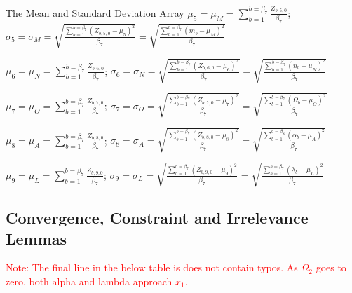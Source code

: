 \begin{definition}{The Mean and Standard Deviation Array}
$\mu_{5}=\mu_{M}=\sum_{b=1}^{b=\beta_{7}}\frac{Z_{b,5,0}}{\beta_{7}}$; $\sigma_{5}=\sigma_{M}=\sqrt{\frac{\sum_{b=1}^{b=\beta_{7}}(Z_{b,5,0}-\mu_{5})^2}{\beta_{7}}}=\sqrt{\frac{\sum_{b=1}^{b=\beta_{7}}(m_{b}-\mu_{M})^2}{\beta_{7}}}$

$\mu_{6}=\mu_{N}=\sum_{b=1}^{b=\beta_{7}}\frac{Z_{b,6,0}}{\beta_{7}}$; $\sigma_{6}=\sigma_{N}=\sqrt{\frac{\sum_{b=1}^{b=\beta_{7}}(Z_{b,6,0}-\mu_{6})^2}{\beta_{7}}}=\sqrt{\frac{\sum_{b=1}^{b=\beta_{7}}(n_{b}-\mu_{N})^2}{\beta_{7}}}$

$\mu_{7}=\mu_{O}=\sum_{b=1}^{b=\beta_{7}}\frac{Z_{b,7,0}}{\beta_{7}}$; $\sigma_{7}=\sigma_{O}=\sqrt{\frac{\sum_{b=1}^{b=\beta_{7}}(Z_{b,7,0}-\mu_{7})^2}{\beta_{7}}}=\sqrt{\frac{\sum_{b=1}^{b=\beta_{7}}(\Omega_{b}-\mu_{O})^2}{\beta_{7}}}$

$\mu_{8}=\mu_{A}=\sum_{b=1}^{b=\beta_{7}}\frac{Z_{b,8,0}}{\beta_{7}}$; $\sigma_{8}=\sigma_{A}=\sqrt{\frac{\sum_{b=1}^{b=\beta_{7}}(Z_{b,8,0}-\mu_{8})^2}{\beta_{7}}}=\sqrt{\frac{\sum_{b=1}^{b=\beta_{8}}(\alpha_{b}-\mu_{A})^2}{\beta_{7}}}$

$\mu_{9}=\mu_{L}=\sum_{b=1}^{b=\beta_{7}}\frac{Z_{b,9,0}}{\beta_{7}}$; $\sigma_{9}=\sigma_{L}=\sqrt{\frac{\sum_{b=1}^{b=\beta_{7}}(Z_{b,9,0}-\mu_{9})^2}{\beta_{7}}}=\sqrt{\frac{\sum_{b=1}^{b=\beta_{7}}(\lambda_{b}-\mu_{L})^2}{\beta_{7}}}$
\end{definition}
\newpage
\subsection{Convergence, Constraint and Irrelevance Lemmas}
\textcolor{red}{Note: The final line in the below table is does not contain typos. As $\Omega_{2}$ goes to zero, both alpha and lambda approach $x_{1}$.}

